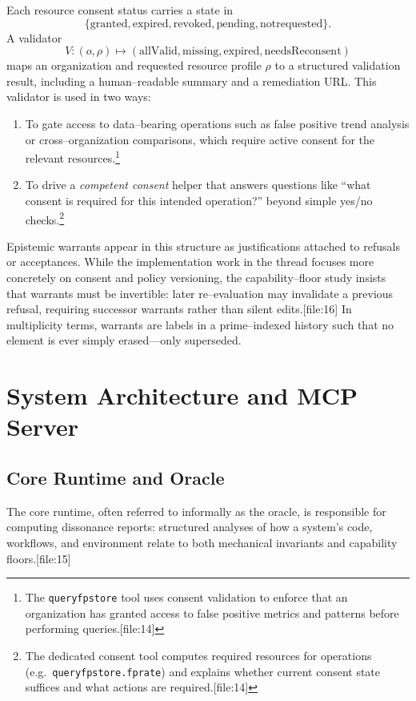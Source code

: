 \documentclass[11pt]{article}
\begin{document}
Each resource consent status carries a state in
\[
  \{\text{granted},\text{expired},\text{revoked},\text{pending},\text{notrequested}\}.
\]
A validator
\[
  V\colon (o,\rho) \mapsto (\text{allValid}, \text{missing}, \text{expired}, \text{needsReconsent})
\]
maps an organization and requested resource profile \(\rho\) to a structured validation result, including a human--readable summary and a remediation URL. This validator is used in two ways:
\begin{enumerate}[leftmargin=*]
  \item To gate access to data--bearing operations such as false positive trend analysis or cross--organization comparisons, which require active consent for the relevant resources.\footnote{The \texttt{queryfpstore} tool uses consent validation to enforce that an organization has granted access to false positive metrics and patterns before performing queries.[file:14]} 
  \item To drive a \emph{competent consent} helper that answers questions like ``what consent is required for this intended operation?'' beyond simple yes/no checks.\footnote{The dedicated consent tool computes required resources for operations (e.g.\ \texttt{queryfpstore.fprate}) and explains whether current consent state suffices and what actions are required.[file:14]} 
\end{enumerate}

Epistemic warrants appear in this structure as justifications attached to refusals or acceptances. While the implementation work in the thread focuses more concretely on consent and policy versioning, the capability--floor study insists that warrants must be invertible: later re--evaluation may invalidate a previous refusal, requiring successor warrants rather than silent edits.[file:16] In multiplicity terms, warrants are labels in a prime--indexed history such that no element is ever simply erased---only superseded.

\section{System Architecture and MCP Server}

\subsection{Core Runtime and Oracle}

The core runtime, often referred to informally as the oracle, is responsible for computing dissonance reports: structured analyses of how a system's code, workflows, and environment relate to both mechanical invariants and capability floors.[file:15]
\end{document}
